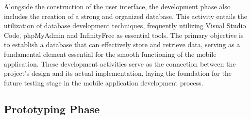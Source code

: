 Alongside the construction of the user interface, the development phase also includes the creation of a strong and organized database. This activity entails the utilization of database development techniques, frequently utilizing Visual Studio Code, phpMyAdmin and InfinityFree as essential tools. The primary objective is to establish a database that can effectively store and retrieve data, serving as a fundamental element essential for the smooth functioning of the mobile application. These development activities serve as the connection between the project's design and its actual implementation, laying the foundation for the future testing stage in the mobile application development process.
\pagebreak

\subsection{Prototyping Phase}
